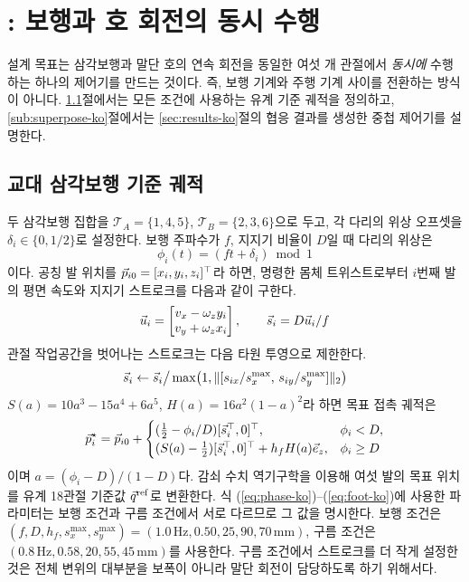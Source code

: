 \section{\gaitname{}: 보행과 호 회전의 동시 수행}

설계 목표는 삼각보행과 말단 호의 연속 회전을 동일한 여섯 개 관절에서
\emph{동시에} 수행하는 하나의 제어기를 만드는 것이다. 즉, 보행 기계와 주행
기계 사이를 전환하는 방식이 아니다. \ref{sub:tripod-ko}절에서는 모든 조건에
사용하는 유계 기준 궤적을 정의하고, \ref{sub:superpose-ko}절에서는
\ref{sec:results-ko}절의 협응 결과를 생성한 중첩 제어기를 설명한다.

\subsection{교대 삼각보행 기준 궤적}\label{sub:tripod-ko}

두 삼각보행 집합을 $\mathcal{T}_A=\{1,4,5\}$,
$\mathcal{T}_B=\{2,3,6\}$으로 두고, 각 다리의 위상 오프셋을
$\delta_i\in\{0,1/2\}$로 설정한다. 보행 주파수가 $f$, 지지기 비율이 $D$일 때
다리의 위상은
\begin{equation}
 \phi_i(t)=(ft+\delta_i)\bmod 1                                \label{eq:phase-ko}
\end{equation}
이다. 공칭 발 위치를 $\vec{p}_{i0}=[x_i,y_i,z_i]^\top$라 하면, 명령한 몸체
트위스트로부터 $i$번째 발의 평면 속도와 지지기 스트로크를 다음과 같이 구한다.
\begin{equation}
 \vec{u}_i=\begin{bmatrix}v_x-\omega_zy_i\\v_y+\omega_zx_i\end{bmatrix},
 \qquad\vec{s}_i=D\vec{u}_i/f                                \label{eq:stroke-ko}
\end{equation}
관절 작업공간을 벗어나는 스트로크는 다음 타원 투영으로 제한한다.
\begin{equation*}
 \vec{s}_i\leftarrow\vec{s}_i\big/
 \max\bigl(1,\|[s_{ix}/s_x^{\max},\,s_{iy}/s_y^{\max}]\|_2\bigr)
\end{equation*}
$S(a)=10a^3-15a^4+6a^5$, $H(a)=16a^2(1-a)^2$라 하면 목표 접촉 궤적은
\begin{equation}
 \vec{p}_i^\star=\vec{p}_{i0}+\begin{cases}
 (\tfrac12-\phi_i/D)[\vec{s}_i^\top,0]^\top,&\phi_i<D,\\
 (S(a)-\tfrac12)[\vec{s}_i^\top,0]^\top+h_fH(a)\vec{e}_z,&\phi_i\ge D
 \end{cases}                                                   \label{eq:foot-ko}
\end{equation}
이며 $a=(\phi_i-D)/(1-D)$다. 감쇠 수치 역기구학을 이용해 여섯 발의 목표 위치를
유계 18관절 기준값 $\vec{q}^{\rm ref}$로 변환한다. 식
(\ref{eq:phase-ko})--(\ref{eq:foot-ko})에 사용한 파라미터는 보행 조건과 구름
조건에서 서로 다르므로 그 값을 명시한다. 보행 조건은
$(f,D,h_f,s_x^{\max},s_y^{\max})=(1.0\,\mathrm{Hz},0.50,25,90,70\,\mathrm{mm})$,
구름 조건은 $(0.8\,\mathrm{Hz},0.58,20,55,45\,\mathrm{mm})$를 사용한다. 구름
조건에서 스트로크를 더 작게 설정한 것은 전체 변위의 대부분을 보폭이 아니라
말단 회전이 담당하도록 하기 위해서다.

